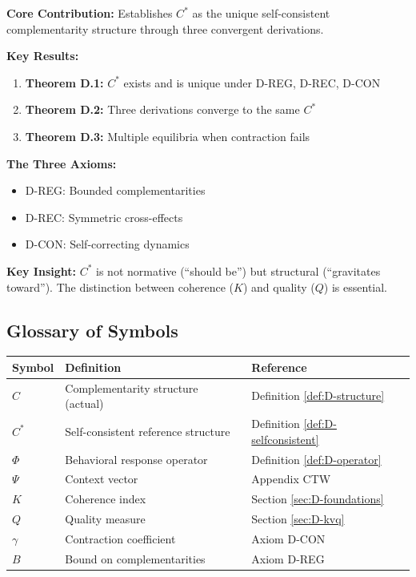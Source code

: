 \begin{tcolorbox}[colback=blue!5!white, colframe=blue!75!black,
    title=\textbf{Appendix UNMAPPED_PRF Summary: FORMAL-CSTAR}]

\textbf{Core Contribution:}
Establishes $C^*$ as the unique self-consistent complementarity structure
through three convergent derivations.

\textbf{Key Results:}
\begin{enumerate}[nosep]
    \item \textbf{Theorem D.1:} $C^*$ exists and is unique under D-REG, D-REC, D-CON
    \item \textbf{Theorem D.2:} Three derivations converge to the same $C^*$
    \item \textbf{Theorem D.3:} Multiple equilibria when contraction fails
\end{enumerate}

\textbf{The Three Axioms:}
\begin{itemize}[nosep]
    \item D-REG: Bounded complementarities
    \item D-REC: Symmetric cross-effects
    \item D-CON: Self-correcting dynamics
\end{itemize}

\textbf{Key Insight:}
$C^*$ is not normative (``should be'') but structural (``gravitates toward'').
The distinction between coherence ($K$) and quality ($Q$) is essential.

\end{tcolorbox}


\subsection{Glossary of Symbols}

\begin{center}
\renewcommand{\arraystretch}{1.3}
\begin{tabular}{@{}lll@{}}
\toprule
\textbf{Symbol} & \textbf{Definition} & \textbf{Reference} \\
\midrule
$C$ & Complementarity structure (actual) & Definition \ref{def:D-structure} \\
$C^*$ & Self-consistent reference structure & Definition \ref{def:D-selfconsistent} \\
$\Phi$ & Behavioral response operator & Definition \ref{def:D-operator} \\
$\Psi$ & Context vector & Appendix CTW \\
$K$ & Coherence index & Section \ref{sec:D-foundations} \\
$Q$ & Quality measure & Section \ref{sec:D-kvq} \\
$\gamma$ & Contraction coefficient & Axiom D-CON \\
$B$ & Bound on complementarities & Axiom D-REG \\
\bottomrule
\end{tabular}
\end{center}

